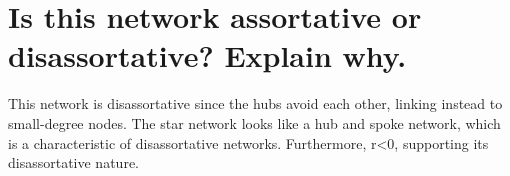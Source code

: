 \documentclass{article}%
\begin{document}
%
\section{Is this network assortative or disassortative? Explain why.}%
\label{sec:Isthisnetworkassortativeordisassortative?Explainwhy.}%
This network is disassortative since the hubs avoid each other, linking instead to small{-}degree nodes. The star network looks like a hub and spoke network, which is a characteristic of disassortative networks. Furthermore, r<0, supporting its disassortative nature.

%
\end{document}
